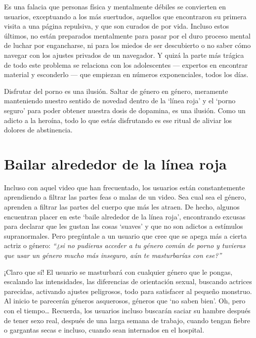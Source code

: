 \documentclass[
  spanish,
  openany]{book}
\begin{document}
Es una falacia que personas física y mentalmente débiles se convierten en usuarios, exceptuando a los más suertudos, aquellos que encontraron su primera visita a una página repulsiva, y que son curados de por vida. Incluso estos últimos, no están preparados mentalmente para pasar por el duro proceso mental de luchar por engancharse, ni para los miedos de ser descubierto o no saber cómo navegar con los ajustes privados de un navegador. Y quizá la parte más trágica de todo este problema se relaciona con los adolescentes --- expertos en encontrar material y esconderlo --- que empiezan en números exponenciales, todos los días.

Disfrutar del porno es una ilusión. Saltar de género en género, meramente manteniendo nuestro sentido de novedad dentro de la `línea roja' y el `porno seguro' para poder obtener nuestra dosis de dopamina, es una ilusión. Como un adicto a la heroína, todo lo que estás disfrutando es ese ritual de aliviar los dolores de abstinencia.

\hypertarget{bailar-alrededor-de-la-luxednea-roja}{%
\section{Bailar alrededor de la línea roja}\label{bailar-alrededor-de-la-luxednea-roja}}

Incluso con aquel video que han frecuentado, los usuarios están constantemente aprendiendo a filtrar las partes feas o malas de un video. Sea cual sea el género, aprenden a filtrar las partes del cuerpo que más les atraen. De hecho, algunos encuentran placer en este `baile alrededor de la línea roja', encontrando excusas para declarar que les gustan las cosas `suaves' y que no son adictos a estímulos supranormales. Pero pregúntale a un usuario que cree que se apega más a cierta actriz o género: \emph{``¿si no pudieras acceder a tu género común de porno y tuvieras que usar un género mucho más inseguro, aún te masturbarías con ese?''}

¡Claro que sí! El usuario se masturbará con cualquier género que le pongas, escalando las intensidades, las diferencias de orientación sexual, buscando actrices parecidas, activando ajustes peligrosos, todo para satisfacer al pequeño monstruo. Al inicio te parecerán géneros asquerosos, géneros que `no saben bien'. Oh, pero con el tiempo\ldots{}
Recuerda, los usuarios incluso buscarán saciar su hambre después de tener sexo real, después de una larga semana de trabajo, cuando tengan fiebre o gargantas secas e incluso, cuando sean internados en el hospital.
\end{document}
